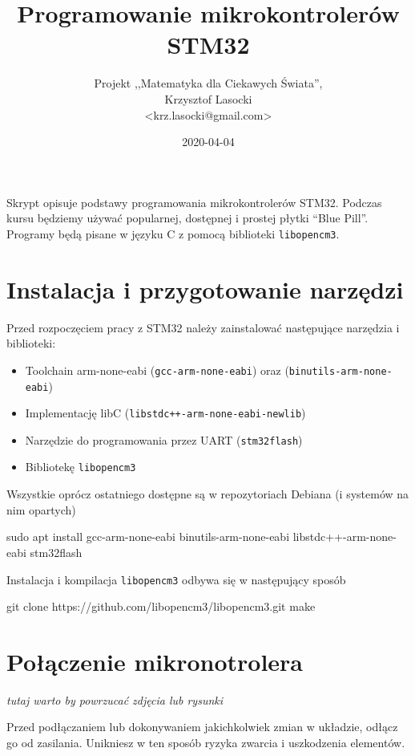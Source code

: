 \documentclass{pdfBooklets}
\title{Programowanie mikrokontrolerów STM32}
\author{%
	Projekt ,,Matematyka dla Ciekawych Świata'',\\
	Krzysztof Lasocki\\\normalsize\ttfamily <krz.lasocki@gmail.com>
}
\date  {2020-04-04}
\begin{document}
\maketitle


Skrypt opisuje podstawy programowania mikrokontrolerów STM32. Podczas kursu będziemy używać
popularnej, dostępnej i prostej płytki ``Blue Pill''. Programy będą pisane w języku
C z pomocą biblioteki \Verb$libopencm3$.

\section{Instalacja i przygotowanie narzędzi}

Przed rozpoczęciem pracy z STM32 należy zainstalować następujące narzędzia i biblioteki:

\begin{itemize}
  \item Toolchain arm-none-eabi (\Verb$gcc-arm-none-eabi$) oraz (\Verb$binutils-arm-none-eabi$)
  \item Implementację libC (\Verb$libstdc++-arm-none-eabi-newlib$)
  \item Narzędzie do programowania przez UART (\Verb$stm32flash$)
  \item Bibliotekę \Verb$libopencm3$
\end{itemize}
Wszystkie oprócz ostatniego dostępne są w repozytoriach Debiana (i systemów na nim opartych)

\begin{CodeFrame*}[bash]{}
sudo apt install gcc-arm-none-eabi binutils-arm-none-eabi libstdc++-arm-none-eabi stm32flash
\end{CodeFrame*}

Instalacja i kompilacja \Verb$libopencm3$ odbywa się w następujący sposób

\begin{CodeFrame*}[bash]{}
git clone https://github.com/libopencm3/libopencm3.git
make
\end{CodeFrame*}

\section{Połączenie mikronotrolera}
\textit {tutaj warto by powrzucać zdjęcia lub rysunki}

\begin{ProTip}{}
  Przed podłączaniem lub dokonywaniem jakichkolwiek zmian w układzie, odłącz go od zasilania. Unikniesz
  w ten sposób ryzyka zwarcia i uszkodzenia elementów.
\end{ProTip}
\end{document}
